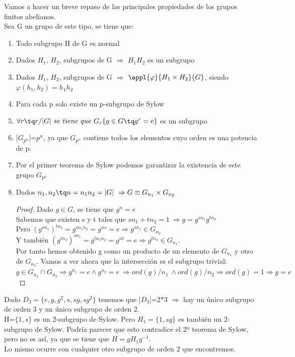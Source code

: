 \documentclass[nochap]{apuntes}
\begin{document}
  Vamos a hacer un breve repaso de las principales propiedades de los grupos finitos abelianos.\\
  Sea G un grupo de este tipo, se tiene que:\\
  \begin{enumerate}
   \item Todo subgrupo H de G es normal
   \item Dados $H_1$,  $H_2$, subgrupos de G $\Rightarrow$  $H_1H_2$  es un subgrupo
   \item Dados $H_1$,  $H_2$, subgrupos de G $\Rightarrow$ $\appl{\varphi}{H_1\times H_2}{G}$, siendo $\varphi(h_1,h_2)=h_1h_2$
   \item Para cada p solo existe un p-subgrupo de Sylow
   \item $\forall r \tq r / |G| \ se \ tiene \ que \ G_r\{g \in G \tq g^{r}=e\}$  es un subgrupo
   \item |$G_{p^{\alpha}}$|=$p^{n}$, ya que $G_{p^{\alpha}}$  contiene todos los elementos cuyo orden es una potencia de p.
   \item Por el primer teorema de Sylow podemos garantizar la existencia de este grupo $G_{p^{\alpha}}$
   \item Dados $n_1, n_2 \tq n=n_1n_2=|G| \ \Rightarrow G \equiv G_{n_1}\times G_{n_2}$
   \begin{proof}
    Dado $g \in G$, se tiene que $g^{n}=e$\\
    Sabemos que existen s y t tales que $sn_1+tn_2=1 \ \Rightarrow g=g^{sn_1}g^{tn_2}$\\
    Pero $(g^{sn_1})^{tn_2}=g^{sn_1n_2}=g^{ns}=e \Rightarrow g^{sn_1}\in G_{n_2}$\\
    Y también $(g^{tn_2})^{sn_1}=g^{tn_1n_2}=g^{nt}=e \Rightarrow g^{tn_2}\in G_{n_1}$.\\
    Por tanto hemos obtenido g como un producto de un elemento de $G_{n_1}$  y otro de $G_{n_2}$. Vamos a ver ahora que la intersección
    es el subgrupo trivial:\\
    $g\in G_{n_1} \cap G_{n_2} \Rightarrow g^{n_1}=e \wedge g^{n_2}=e \ \Rightarrow ord(g)/n_1 \ \wedge ord(g)/n_2 \Rightarrow ord(g)=1 \Rightarrow g=e$
   \end{proof}
  \end{enumerate}
  
\begin{example}
 Dado $D_3=\{e,g,g^{2},s, sg, sg^{2}\}$  tenemos que |$D_3$|=2*3 $\Rightarrow$  hay un único subgrupo de orden 3 y un único subgrupo de 
 orden 2.\\
 H=$\{1, s\}$  es un 2-subgrupo de Sylow. Pero $H_1=\{1, sg\}$  es también un 2-subgrupo de Sylow. Podría parecer que esto contradice
 el 2º teorema de Sylow, pero no es así, ya que se tiene que $H=gH_1g^{-1}$.\\
 Lo mismo ocurre con cualquier otro subgrupo de orden 2 que encontremos.
\end{example}
\end{document}
